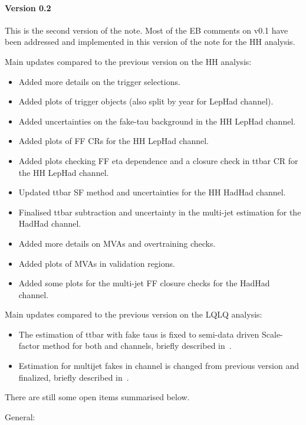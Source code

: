 \paragraph*{Version 0.2}

This is the second version of the note. Most of the EB comments on v0.1 have been addressed and implemented in this version of the note for the HH analysis. 


Main updates compared to the previous version on the HH analysis:

\begin{itemize}
\item Added more details on the trigger selections.
\item Added plots of trigger objects (also split by year for LepHad channel).
\item Added uncertainties on the fake-tau background in the HH LepHad channel.
\item Added plots of FF CRs for the HH LepHad channel.
\item Added plots checking FF eta dependence and a closure check in ttbar CR for the HH LepHad channel.
\item Updated ttbar SF method and uncertainties for the HH HadHad channel.
\item Finalised ttbar subtraction and uncertainty in the multi-jet estimation for the HadHad channel.
\item Added more details on MVAs and overtraining checks.
\item Added plots of MVAs in validation regions.
\item Added some plots for the multi-jet FF closure checks for the HadHad channel.
\end{itemize}


Main updates compared to the previous version on the LQLQ analysis:

\begin{itemize}
\item The estimation of ttbar with fake taus is fixed to semi-data driven Scale-factor method for both \lephad and \hadhad channels,  briefly described in~.
\item Estimation for multijet fakes in \hadhad channel is changed from previous version and finalized, briefly described in~.
\end{itemize}


There are still some open items summarised below.

General:

